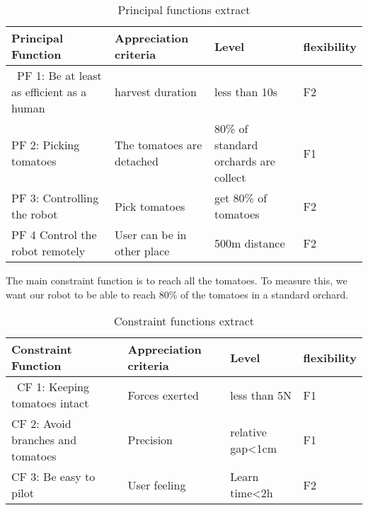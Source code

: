 \begin{table}[ht]
    \centering  
    \begin{tabular}{|p{3cm} | p{3cm} | p{3cm} | p{3cm} |} 
        \hline
        \textbf{Principal Function} & \textbf{Appreciation criteria} & \textbf{Level} & \textbf{flexibility} \\ [0.5ex] 
        \hline\
        PF 1: Be at least as efficient as a human & harvest duration & less than 10s & F2 \\ 
        \hline
        PF 2: Picking tomatoes & The tomatoes are detached & 80\% of standard orchards are collect & F1 \\
        \hline
        PF 3: Controlling the robot & Pick tomatoes & get 80\% of tomatoes & F2 \\
        \hline
        PF 4 Control the robot remotely  & User can be in other place & 500m distance & F2 \\
        \hline
    \end{tabular}
    \caption{Principal functions extract}
\end{table}

\bigbreak
The main constraint function is to reach all the tomatoes. To measure this, we want our robot to be able to reach 80\% of the tomatoes in a standard orchard. 

\begin{table}[ht]
    \centering    
    \begin{tabular}{|p{3cm} | p{3cm} | p{3cm} | p{3cm} |} 
        \hline
        \textbf{Constraint Function} & \textbf{Appreciation criteria} & \textbf{Level} & \textbf{flexibility} \\ [0.5ex] 
        \hline\
        CF 1: Keeping tomatoes intact & Forces exerted & less than 5N & F1 \\ 
        \hline
        CF 2: Avoid branches and tomatoes & Precision & relative gap<1cm & F1 \\
        \hline
        CF 3: Be easy to pilot & User feeling & Learn time<2h & F2 \\
        \hline
    \end{tabular}
    \caption{Constraint functions extract}
\end{table}

